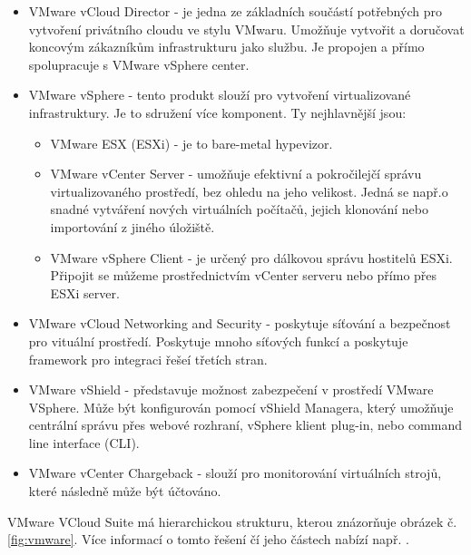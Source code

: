 \begin{itemize}
\item VMware vCloud Director - je  jedna  ze základních součástí potřebných pro vytvoření  privátního  cloudu ve stylu VMwaru.  Umožňuje vytvořit  a  doručovat  koncovým  zákazníkům infrastrukturu jako službu. Je propojen a přímo spolupracuje s VMware vSphere center.
\item VMware vSphere - tento produkt slouží pro vytvoření virtualizované infrastruktury. Je to sdružení více komponent. Ty nejhlavnější jsou:
\begin{itemize}
\item VMware ESX (ESXi) - je to bare-metal hypevizor.
\item VMware vCenter Server - umožňuje efektivní a pokročilejčí správu virtualizovaného prostředí, bez ohledu na jeho velikost. Jedná se např.o snadné vytváření nových virtuálních počítačů, jejich  klonování  nebo  importování  z jiného  úložiště.  
\item VMware vSphere Client - je určený pro dálkovou správu hostitelů ESXi. Připojit se můžeme prostřednictvím vCenter serveru nebo přímo přes ESXi server.
\end{itemize} 
\item VMware vCloud Networking and Security - poskytuje síťování a bezpečnost pro vituální prostředí. Poskytuje mnoho síťových funkcí a poskytuje framework pro integraci řešeí třetích stran.
\item VMware vShield - představuje možnost zabezpečení v prostředí VMware VSphere. Může být konfigurován pomocí vShield Managera, který umožňuje centrální správu přes webové rozhraní, vSphere klient plug-in, nebo command line interface (CLI).
\item VMware vCenter Chargeback - slouží pro monitorování virtuálních strojů, které následně může být účtováno.
\end{itemize}

VMware VCloud Suite má hierarchickou strukturu, kterou znázorňuje obrázek č. \ref{fig:vmware}. Více informací o tomto řešení čí jeho částech nabízí např. \cite{vmware} .

